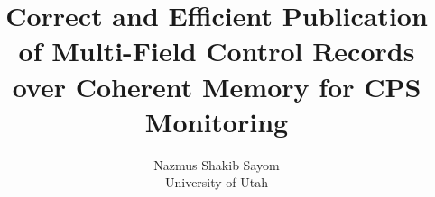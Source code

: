 \documentclass[letterpaper,twocolumn,10pt]{article}
\begin{document}
\date{}

\title{\Large\bf Correct and Efficient Publication of Multi-Field Control Records over Coherent Memory for CPS Monitoring}

\author{
{\rm Nazmus Shakib Sayom}\\
University of Utah
}

\maketitle
\thispagestyle{empty}










{\footnotesize


}
\end{document}
